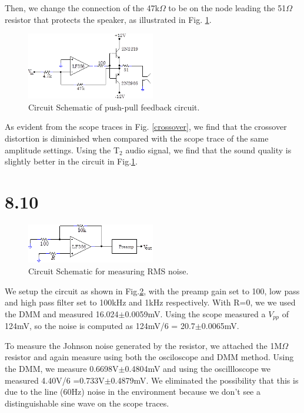 \documentclass[authoryear, 12pt,5p, times]{elsarticle}
\begin{document}
 \par Then, we change the connection of the 47k$\Omega$ to be on the node leading the 51$\Omega$ resistor that protects the speaker, as illustrated in Fig. \ref{8_9_schema2}.
 \begin{figure}[h!]
 \centering
  \includegraphics[width=0.5\textwidth]{figure/8_9_schema2.png}
\caption{Circuit Schematic of push-pull feedback circuit.}
\label{8_9_schema2}
 \end{figure}
\par As evident from the scope traces in Fig. \ref{crossover}, we find that the crossover distortion is diminished when compared with the scope trace of the same amplitude settings. Using the T$_2$ audio signal, we find that the sound quality is slightly better in the circuit in Fig.\ref{8_9_schema2}.
 \section*{8.10}
  \begin{figure}[h!]
 \centering
  \includegraphics[width=0.5\textwidth]{figure/8_10_schema.png}
\caption{Circuit Schematic for measuring RMS noise.}
\label{8_10_schema}
 \end{figure}
 We setup the circuit as shown in Fig.\ref{8_10_schema}, with the preamp gain set to 100, low pass and high pass filter set to 100kHz and 1kHz respectively. With R=0, we we used the DMM  and measured 16.024$\pm$0.0059mV. Using the scope measured a $V_{pp}$ of 124mV, so the noise is computed as 124mV/6 = 20.7$\pm$0.0065mV. 
 \par To measure the Johnson noise generated by the resistor, we attached the 1M$\Omega$ resistor and again measure using both the osciloscope and DMM method. Using the DMM, we measure 0.6698V$\pm$0.4804mV and using the oscillloscope we measured 4.40V/6 =0.733V$\pm$0.4879mV. We eliminated the possibility that this is due to the line (60Hz) noise in the environment because we don't see a distinguishable sine wave on the scope traces.
\end{document}
